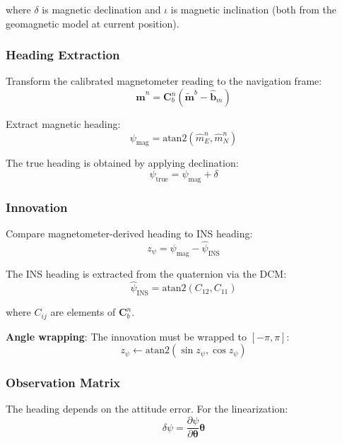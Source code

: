 \documentclass[11pt,a4paper]{article}
\newcommand{\mat}[1]{\mathbf{#1}}
\newcommand{\vect}[1]{\boldsymbol{#1}}
\begin{document}
where $\delta$ is magnetic declination and $\iota$ is magnetic inclination (both from the geomagnetic model at current position).

\subsubsection{Heading Extraction}

Transform the calibrated magnetometer reading to the navigation frame:
\begin{equation}
    \hat{\mat{m}}^n = \mat{C}_b^n (\tilde{\mat{m}}^b - \hat{\mat{b}}_m)
\end{equation}

Extract magnetic heading:
\begin{equation}
    \psi_{\text{mag}} = \text{atan2}(\hat{m}_E^n, \hat{m}_N^n)
\end{equation}

The true heading is obtained by applying declination:
\begin{equation}
    \psi_{\text{true}} = \psi_{\text{mag}} + \delta
\end{equation}

\subsubsection{Innovation}

Compare magnetometer-derived heading to INS heading:
\begin{equation}
    z_{\psi} = \psi_{\text{mag}} - \hat{\psi}_{\text{INS}}
\end{equation}

The INS heading is extracted from the quaternion via the DCM:
\begin{equation}
    \hat{\psi}_{\text{INS}} = \text{atan2}(C_{12}, C_{11})
\end{equation}

where $C_{ij}$ are elements of $\mat{C}_b^n$.

\textbf{Angle wrapping}: The innovation must be wrapped to $[-\pi, \pi]$:
\begin{equation}
    z_{\psi} \leftarrow \text{atan2}(\sin z_{\psi}, \cos z_{\psi})
\end{equation}

\subsubsection{Observation Matrix}

The heading depends on the attitude error. For the linearization:
\begin{equation}
    \delta\psi = \frac{\partial \psi}{\partial \vect{\theta}} \vect{\theta}
\end{equation}
\end{document}
